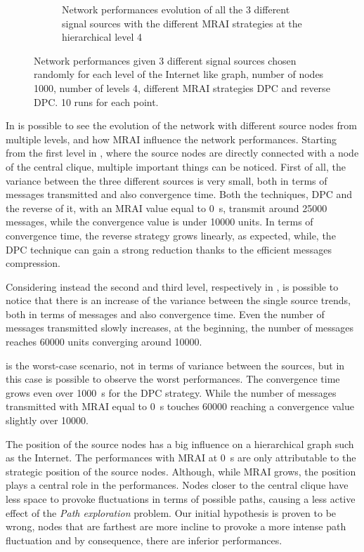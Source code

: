 \begin{figure}[h]
\begin{subfigure}[b]{0.49\textwidth}
		 \caption{Network performances evolution of all the \num{3} different signal sources
			with the different \ac{MRAI} strategies at the hierarchical level \num{4}}
         \label{fig:different_levels_4}
     \end{subfigure}
     \hfill
	 \caption{Network performances given \num{3} different signal sources chosen
		randomly for each level of the Internet like graph, number of nodes
		\num{1000}, number of levels \num{4}, different \ac{MRAI} strategies
		\ac{DPC} and reverse \ac{DPC}. \num{10} runs for each point.}
	 \label{fig:different_levels}
\end{figure}

In  is possible to see the evolution of the network
with different source nodes from multiple levels, and how \ac{MRAI} influence
the network performances.
Starting from the first level in , where the source
nodes are directly connected with a node of the central clique, multiple
important things can be noticed.
First of all, the variance between the three different sources is very small,
both in terms of messages transmitted and also convergence time.
Both the techniques, \ac{DPC} and the reverse of it, with an \ac{MRAI} value
equal to \SI{0}{\second}, transmit around \num{25000} messages, while the
convergence value is under \num{10000} units.
In terms of convergence time, the reverse strategy grows linearly, as expected,
while, the \ac{DPC} technique can gain a strong reduction thanks to
the efficient messages compression.

Considering instead the second and third level, respectively in
, is possible to notice that there
is an increase of the variance between the single source trends, both in terms
of messages and also convergence time.
Even the number of messages transmitted slowly increases, at the beginning, the
number of messages reaches \num{60000} units converging around \num{10000}.

 is the worst-case scenario, not in
terms of variance between the sources, but in this case is possible to observe
the worst performances.
The convergence time grows even over \SI{1000}{\second} for the \ac{DPC} strategy.
While the number of messages transmitted with \ac{MRAI} equal to \SI{0}{\second}
touches \num{60000} reaching a convergence value slightly over \num{10000}.

The position of the source nodes has a big influence on a hierarchical graph
such as the Internet.
The performances with \ac{MRAI} at \SI{0}{\second} are only attributable to the
strategic position of the source nodes.
Although, while \ac{MRAI} grows, the position plays a central role in the performances.
Nodes closer to the central clique have less space to provoke fluctuations
in terms of possible paths, causing a less active effect of the \textit{Path exploration}
problem.
Our initial hypothesis is proven to be wrong, nodes that are farthest are more incline
to provoke a more intense path fluctuation and by consequence, there are inferior
performances.

